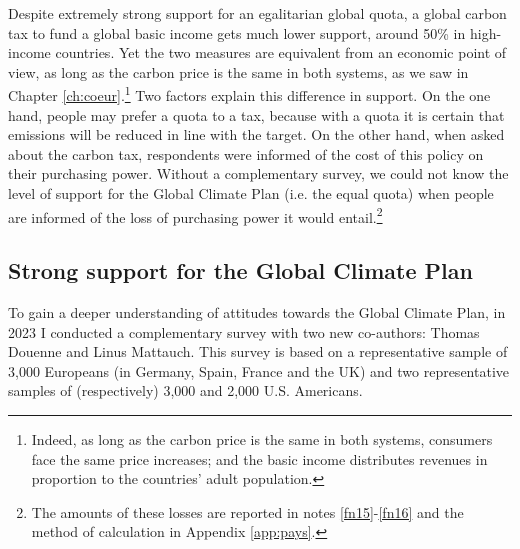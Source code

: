 \documentclass[a5paper,english,openany]{memoir}
\begin{document}
Despite extremely strong support for an egalitarian global quota, a global carbon tax to fund a global basic income gets much lower support, around 50\% in high-income countries. Yet the two measures are equivalent from an economic point of view, as long as the carbon price is the same in both systems, as we saw in Chapter \ref{ch:coeur}.\footnote{Indeed, as long as the carbon price is the same in both systems, consumers face the same price increases; and the basic income distributes revenues in proportion to the countries' adult population.}  
Two factors explain this difference in support. On the one hand, people may prefer a quota to a tax, because with a quota it is certain that emissions will be reduced in line with the target. On the other hand, when asked about the carbon tax, respondents were informed of the cost of this policy on their purchasing power. Without a complementary survey, we could not know the level of support for the Global Climate Plan (i.e. the equal quota) when people are informed of the loss of purchasing power it would entail.\footnote{The amounts of these losses are reported in notes \ref{fn15}-\ref{fn16} and the method of calculation in Appendix \ref{app:pays}.}   


\subsection{Strong support for the Global Climate Plan}

To gain a deeper understanding of attitudes towards the Global Climate Plan, in 2023 I conducted a complementary survey with two new co-authors: Thomas Douenne and Linus Mattauch. This survey is based on a representative sample of 3,000 Europeans (in Germany, Spain, France and the UK) and two representative samples of (respectively) 3,000 and 2,000 U.S. Americans. 
\end{document}
